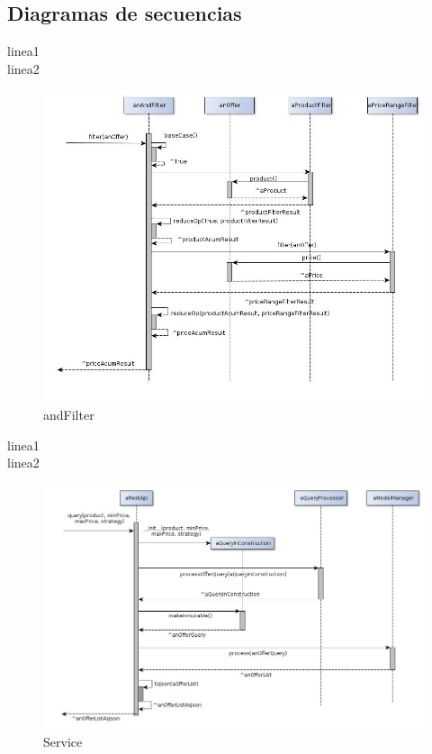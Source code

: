 \documentclass[10pt, a4paper]{article}
\begin{document}
\begin{landscape}
\newpage
\subsection{Diagramas de secuencias}
linea1\\
linea2\\
\begin{figure}[H]
\centering
\includegraphics[scale=0.6]{graphics/andFilter_sequence.jpg}
\caption{andFilter}
\end{figure}
\newpage
linea1\\
linea2\\
\begin{figure}[H]
\centering
\includegraphics[scale=0.70]{graphics/service_sequence.jpg}
\caption{Service}
\end{figure}

\end{landscape}
\end{document}
